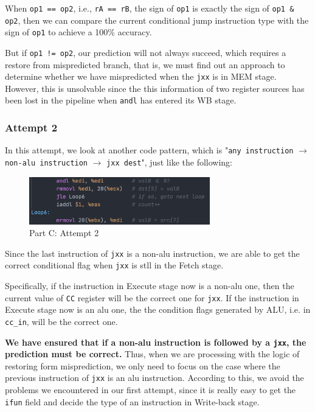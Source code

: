 \documentclass[12pt,a4paper]{article}
\begin{document}
When \texttt{op1 == op2}, i.e., \texttt{rA == rB}, the sign of \texttt{op1} is exactly the sign of \texttt{op1 \& op2}, then we can compare the current conditional jump instruction type with the sign of \texttt{op1} to achieve a 100\% accuracy. 

But if \texttt{op1 != op2}, our prediction will not always succeed, which requires a restore from mispredicted branch, that is, we must find out an approach to determine whether we have mispredicted when the \texttt{jxx} is in MEM stage. However, this is unsolvable since the this information of two register sources has been lost in the pipeline when \texttt{andl} has entered its WB stage.
\subsubsection{Attempt 2}
In this attempt, we look at another code pattern, which is "\texttt{any instruction} $\rightarrow$ \texttt{non-alu instruction} $\rightarrow$ \texttt{jxx dest}", just like the following:
\begin{figure}[H] %
        \centering %
        \includegraphics[width=0.7\textwidth]{partC-attempt2.png} %
        \caption{Part C: Attempt 2} %
        \label{Fig.partC-attempt2} %
\end{figure}
Since the last instruction of \texttt{jxx} is a non-alu instruction, we are able to get the correct conditional flag when \texttt{jxx} is stll in the Fetch stage. 

Specifically, if the instruction in Execute stage now is a non-alu one, then the current value of \texttt{CC} register will be the correct one for \texttt{jxx}. If the instruction in Execute stage now is an alu one, the the condition flags generated by ALU, i.e. in \texttt{cc\_in}, will be the correct one. 

\textbf{We have ensured that if a non-alu instruction is followed by a \texttt{jxx}, the prediction must be correct.} Thus, when we are processing with the logic of restoring form misprediction, we only need to focus on the case where the previous instruction of \texttt{jxx} is an alu instruction. According to this, we avoid the problems we encountered in our first attempt, since it is really easy to get the \texttt{ifun} field and decide the type of an instruction in Write-back stage.
\end{document}

